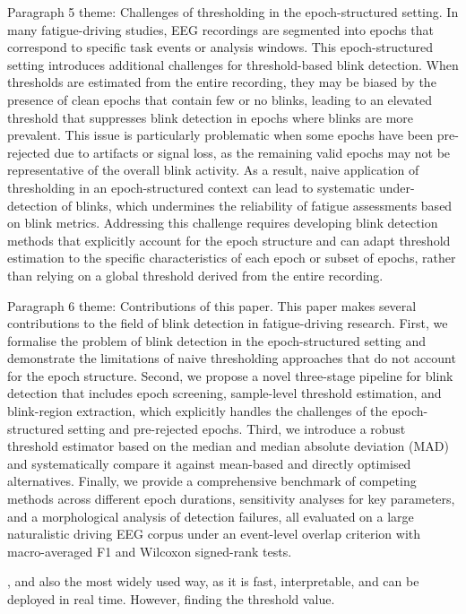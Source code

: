Paragraph 5 theme: Challenges of thresholding in the epoch-structured setting.
In many fatigue-driving studies, EEG recordings are segmented into epochs that correspond to specific task events or analysis windows. This epoch-structured setting introduces additional challenges for threshold-based blink detection. When thresholds are estimated from the entire recording, they may be biased by the presence of clean epochs that contain few or no blinks, leading to an elevated threshold that suppresses blink detection in epochs where blinks are more prevalent. This issue is particularly problematic when some epochs have been pre-rejected due to artifacts or signal loss, as the remaining valid epochs may not be representative of the overall blink activity. As a result, naive application of thresholding in an epoch-structured context can lead to systematic under-detection of blinks, which undermines the reliability of fatigue assessments based on blink metrics. Addressing this challenge requires developing blink detection methods that explicitly account for the epoch structure and can adapt threshold estimation to the specific characteristics of each epoch or subset of epochs, rather than relying on a global threshold derived from the entire recording.


Paragraph 6 theme: Contributions of this paper.
This paper makes several contributions to the field of blink detection in fatigue-driving research. First, we formalise the problem of blink detection in the epoch-structured setting and demonstrate the limitations of naive thresholding approaches that do not account for the epoch structure. Second, we propose a novel three-stage pipeline for blink detection that includes epoch screening, sample-level threshold estimation, and blink-region extraction, which explicitly handles the challenges of the epoch-structured setting and pre-rejected epochs. Third, we introduce a robust threshold estimator based on the median and median absolute deviation (MAD) and systematically compare it against mean-based and directly optimised alternatives. Finally, we provide a comprehensive benchmark of competing methods across different epoch durations, sensitivity analyses for key parameters, and a morphological analysis of detection failures, all evaluated on a large naturalistic driving EEG corpus under an event-level overlap criterion with macro-averaged F1 and Wilcoxon signed-rank tests.



, and also the most widely used way, as it is fast, interpretable, and can be deployed in real time. However, finding the threshold value.


